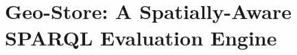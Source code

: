 \documentclass[12pt]{report}
\begin{document}
\chapter{Geo-Store: A Spatially-Aware SPARQL Evaluation Engine}


%

%
%




\end{document}
